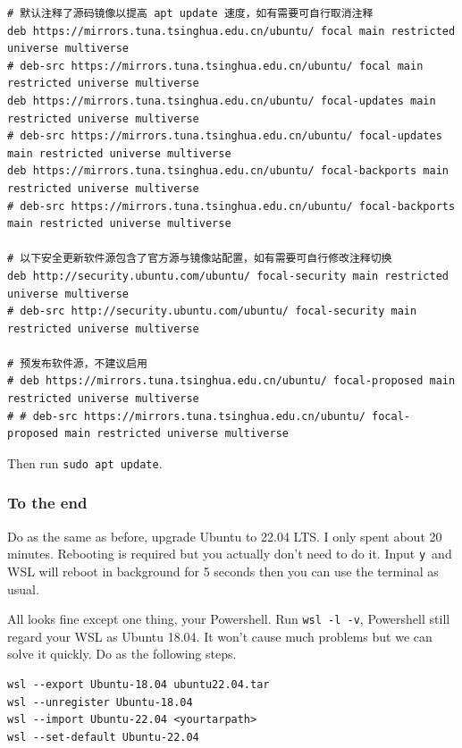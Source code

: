 \documentclass[12pt]{ctexart}
\begin{document}
\fontsize{7}{9}
\begin{adjustwidth}{2em}{0pt}
\begin{verbatim}
# 默认注释了源码镜像以提高 apt update 速度，如有需要可自行取消注释
deb https://mirrors.tuna.tsinghua.edu.cn/ubuntu/ focal main restricted universe multiverse
# deb-src https://mirrors.tuna.tsinghua.edu.cn/ubuntu/ focal main restricted universe multiverse
deb https://mirrors.tuna.tsinghua.edu.cn/ubuntu/ focal-updates main restricted universe multiverse
# deb-src https://mirrors.tuna.tsinghua.edu.cn/ubuntu/ focal-updates main restricted universe multiverse
deb https://mirrors.tuna.tsinghua.edu.cn/ubuntu/ focal-backports main restricted universe multiverse
# deb-src https://mirrors.tuna.tsinghua.edu.cn/ubuntu/ focal-backports main restricted universe multiverse

# 以下安全更新软件源包含了官方源与镜像站配置，如有需要可自行修改注释切换
deb http://security.ubuntu.com/ubuntu/ focal-security main restricted universe multiverse
# deb-src http://security.ubuntu.com/ubuntu/ focal-security main restricted universe multiverse

# 预发布软件源，不建议启用
# deb https://mirrors.tuna.tsinghua.edu.cn/ubuntu/ focal-proposed main restricted universe multiverse
# # deb-src https://mirrors.tuna.tsinghua.edu.cn/ubuntu/ focal-proposed main restricted universe multiverse
\end{verbatim}
\end{adjustwidth}
\fontsize{12}{14}

Then run \texttt{sudo\ apt\ update}.

\subsubsection{\textbf{To the end}}

Do as the same as before, upgrade Ubuntu to 22.04 LTS. I only spent
about 20 minutes. Rebooting is required but you actually
don't need to do it. Input \texttt{y}\ and WSL will
reboot in background for 5 seconds then you can use the terminal as
usual.

All looks fine except one thing, your Powershell. Run
\texttt{wsl\ -l\ -v}, Powershell still regard your WSL as Ubuntu 18.04.
It won't cause much problems but we can solve it
quickly. Do as the following steps.

\begin{adjustwidth}{2em}{0pt}
\begin{verbatim}
wsl --export Ubuntu-18.04 ubuntu22.04.tar
wsl --unregister Ubuntu-18.04
wsl --import Ubuntu-22.04 <yourtarpath>
wsl --set-default Ubuntu-22.04
\end{verbatim}
\end{adjustwidth}
\end{document}

